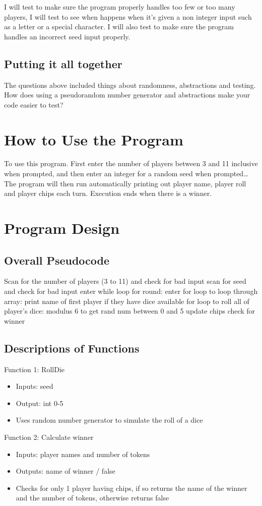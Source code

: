 \documentclass{article}
\begin{document}
I will test to make sure the program properly handles too few or too many players, I will test to see when happens when it's given a non integer input such as a letter or a special character. I will also test to make sure the program handles an incorrect seed input properly.

\subsection{Putting it all together}

The questions above included things about randomness, abstractions and testing. How does using a pseudorandom number generator and abstractions make your code easier to test?


\section{How to Use the Program}

To use this program. First enter the number of players between 3 and 11 inclusive when prompted, and then enter an integer for a random seed when prompted… The program will then run automatically printing out player name, player roll and player chips each turn. Execution ends when there is a winner.

\section{Program Design}

\subsection{Overall Pseudocode}

Scan for the number of players (3 to 11) and check for bad input
scan for seed and check for bad input
enter while loop for round:
	enter for loop to loop through array:
		print name of first player if they have dice available
		for loop to roll all of player's dice:
			modulus 6 to get rand num between 0 and 5
			update chips
		check for winner

\subsection{Descriptions of Functions}

Function 1:
RollDie
\begin{itemize}
	\item Inputs: seed
	\item Output: int 0-5
	\item Uses random number generator to simulate the roll of a dice
\end{itemize}

Function 2: 
Calculate winner
\begin{itemize}
	\item Inputs: player names and number of tokens
	\item Outputs: name of winner / false
	\item Checks for only 1 player having chips, if so returns the name of the winner and the number of tokens, otherwise returns false
\end{itemize}
\end{document}
